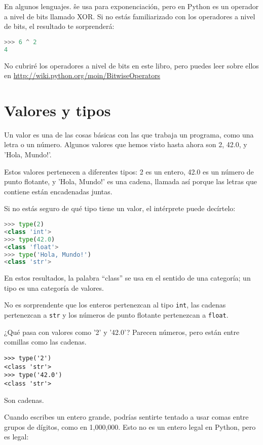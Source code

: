 En algunos lenguajes. \^ se usa para exponenciación, pero en Python es un operador a nivel de bits llamado XOR. 
Si no estás familiarizado con los operadores a nivel de bits, el resultado te sorprenderá:

\begin{lstlisting}[language=Python, basicstyle=\ttfamily]
>>> 6 ^ 2
4
\end{lstlisting}

No cubriré los operadores a nivel de bits en este libro, pero puedes leer sobre ellos en \href{http://wiki.python.org/moin/BitwiseOperators}{http://wiki.python.org/moin/BitwiseOperators}

\section{Valores y tipos}
Un valor es una de las cosas básicas con las que trabaja un programa, como una letra o un número. Algunos valores que hemos visto hasta ahora son 2, 42.0, y 'Hola, Mundo!'. 

Estos valores pertenecen a diferentes tipos: 2 es un entero, 42.0 es un número de punto flotante, y 'Hola, Mundo!' es una cadena, llamada así porque las letras que contiene están encadenadas juntas.

Si no estás seguro de qué tipo tiene un valor, el intérprete puede decírtelo:

\begin{lstlisting}[language=Python, basicstyle=\ttfamily]
>>> type(2)
<class 'int'>
>>> type(42.0)
<class 'float'>
>>> type('Hola, Mundo!')
<class 'str'>
\end{lstlisting}

En estos resultados, la palabra ``class'' se usa en el sentido de una categoría; un tipo es una categoría de valores. 

No es sorprendente que los enteros pertenezcan al tipo \texttt{int}, las cadenas pertenezcan a \texttt{str} y los números de punto flotante pertenezcan a \texttt{float}.

¿Qué pasa con valores como '2' y '42.0'? Parecen números, pero están entre comillas como las cadenas.

\begin{lstlisting}
>>> type('2')
<class 'str'>
>>> type('42.0')
<class 'str'>
\end{lstlisting}

Son cadenas.

Cuando escribes un entero grande, podrías sentirte tentado a usar comas entre grupos de dígitos, como en 1,000,000. Esto no es un entero legal en Python, pero es legal:

